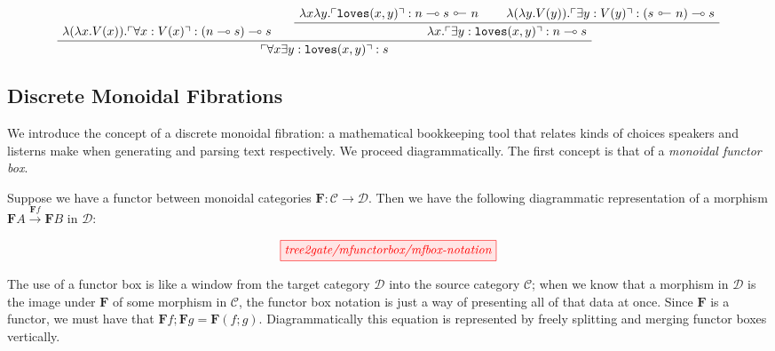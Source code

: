 \begin{example}
\[
\AxiomC{$\lambda (\lambda x . V(x)) . \ulcorner \forall x : V(x) \urcorner : (n \multimap s) \multimap s$}
\AxiomC{$\lambda x \lambda y . \ulcorner \texttt{loves}(x,y) \urcorner : n \multimap s \ \rotatebox[origin=c]{180}{$\multimap$} \ n$}
\AxiomC{$\lambda (\lambda y . V(y)) . \ulcorner \exists y : V(y) \urcorner : (s \ \rotatebox[origin=c]{180}{$\multimap$} \ n) \multimap s$}
\BinaryInfC{$\lambda x . \ulcorner \exists y : \texttt{loves}(x,y) \urcorner : n \multimap s$}
\BinaryInfC{$ \ulcorner \forall x \exists y : \texttt{loves}(x,y) \urcorner : s$}
\DisplayProof
\]

\end{example}



\subsection{Discrete Monoidal Fibrations}

We introduce the concept of a discrete monoidal fibration: a mathematical bookkeeping tool that relates kinds of choices speakers and listerns make when generating and parsing text respectively. We proceed diagrammatically. The first concept is that of a \emph{monoidal functor box}.


Suppose we have a functor between monoidal categories $\mathbf{F}: \mathcal{C} \rightarrow \mathcal{D}$. Then we have the following diagrammatic representation of a morphism $\mathbf{F}A \overset{\mathbf{F}f}{\rightarrow} \mathbf{F}B$ in $\mathcal{D}$:

\[\tikzfig{tree2gate/mfunctorbox/mfbox-notation}\]

The use of a functor box is like a window from the target category $\mathcal{D}$ into the source category $\mathcal{C}$; when we know that a morphism in $\mathcal{D}$ is the image under $\mathbf{F}$ of some morphism in $\mathcal{C}$, the functor box notation is just a way of presenting all of that data at once. Since $\mathbf{F}$ is a functor, we must have that $\mathbf{F}f ; \mathbf{F}g = \mathbf{F}(f;g)$. Diagrammatically this equation is represented by freely splitting and merging functor boxes vertically.

